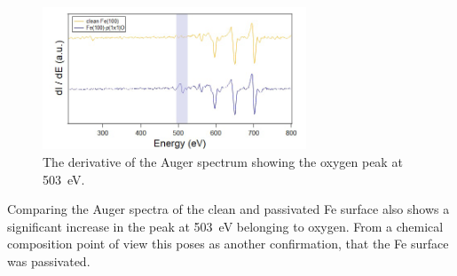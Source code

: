 \begin{figure}[h]
    \centering
    \includegraphics[width = 0.7\textwidth]{Plots/Auger.png}
    \caption{The derivative of the Auger spectrum showing the oxygen peak at \qty{503}{eV}.}
    \label{fig:auger_FeO}
\end{figure}
\FloatBarrier
Comparing the Auger spectra of the clean and passivated Fe surface also shows a significant increase in the peak at \qty{503}{eV} belonging to oxygen.
From a chemical composition point of view this poses as another confirmation, that the Fe surface was passivated.

